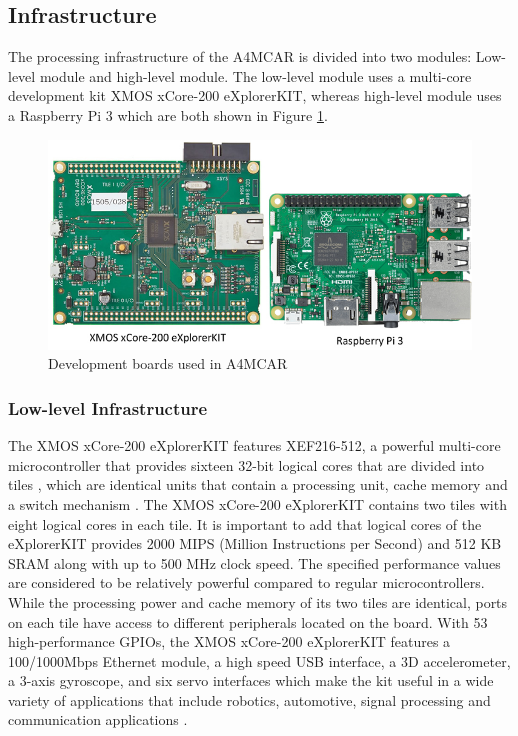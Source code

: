 \subsection{Infrastructure}  %
The processing infrastructure of the A4MCAR is divided into two modules: Low-level module and high-level module. The low-level module uses a multi-core development kit XMOS xCore-200 eXplorerKIT, whereas high-level module uses a Raspberry Pi 3 which are both shown in Figure \ref{fig:boards}.
\begin{figure}[!ht]
	\centering
	\captionsetup{justification=centering}
	\includegraphics[scale=0.6]{content/images/boards.jpg}
	\caption{Development boards used in A4MCAR}
	\label{fig:boards}
\end{figure}

\subsubsection{Low-level Infrastructure} \label{lowlevelmoduleinfra}
The XMOS xCore-200 eXplorerKIT features XEF216-512, a powerful multi-core microcontroller that provides sixteen 32-bit logical cores that are divided into tiles \cite{xmoskitweb}, which are identical units that contain a processing unit, cache memory and a switch mechanism \cite{tileref}. The XMOS xCore-200 eXplorerKIT contains two tiles with eight logical cores in each tile. It is important to add that logical cores of the eXplorerKIT provides 2000 MIPS (Million Instructions per Second) and 512 KB SRAM along with up to 500 MHz clock speed. The specified performance values are considered to be relatively powerful compared to regular microcontrollers. While the processing power and cache memory of its two tiles are identical, ports on each tile have access to different peripherals located on the board. With 53 high-performance GPIOs, the XMOS xCore-200 eXplorerKIT features a 100/1000Mbps Ethernet module, a high speed USB interface, a 3D accelerometer, a 3-axis gyroscope, and six servo interfaces which make the kit useful in a wide variety of applications that include robotics, automotive, signal processing and communication applications \cite{xmoskitweb}.

